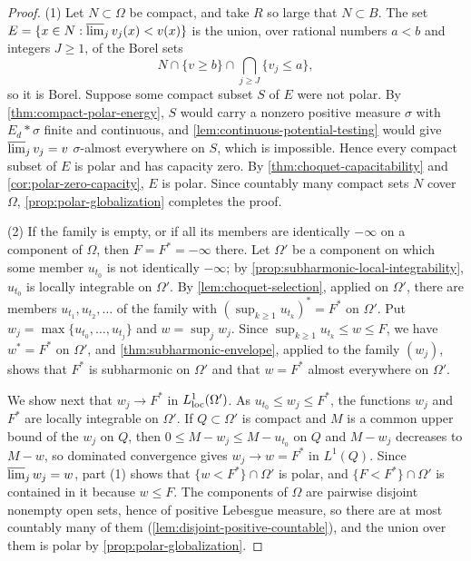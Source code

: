 \begin{proof}
(1) Let $N\subset\Omega$ be compact, and take $R$ so large that $N\subset B$. The set $E=\{x\in N:\varlimsup_jv_j(x)<v(x)\}$ is the union, over rational numbers $a<b$ and integers $J\geq1$, of the Borel sets
\[
 N\cap\{v\geq b\}\cap\bigcap_{j\geq J}\{v_j\leq a\},
\]
so it is Borel. Suppose some compact subset $S$ of $E$ were not polar. By \cref{thm:compact-polar-energy}, $S$ would carry a nonzero positive measure $\sigma$ with $E_d*\sigma$ finite and continuous, and \cref{lem:continuous-potential-testing} would give $\varlimsup_jv_j=v$ $\sigma$-almost everywhere on $S$, which is impossible. Hence every compact subset of $E$ is polar and has capacity zero. By \cref{thm:choquet-capacitability} and \cref{cor:polar-zero-capacity}, $E$ is polar. Since countably many compact sets $N$ cover $\Omega$, \cref{prop:polar-globalization} completes the proof.

(2) If the family is empty, or if all its members are identically $-\infty$ on a component of $\Omega$, then $F=F^*=-\infty$ there. Let $\Omega'$ be a component on which some member $u_{t_0}$ is not identically $-\infty$; by \cref{prop:subharmonic-local-integrability}, $u_{t_0}$ is locally integrable on $\Omega'$. By \cref{lem:choquet-selection}, applied on $\Omega'$, there are members $u_{t_1},u_{t_2},\ldots$ of the family with $(\sup_{k\geq1}u_{t_k})^*=F^*$ on $\Omega'$. Put $w_j=\max\{u_{t_0},\ldots,u_{t_j}\}$ and $w=\sup_jw_j$. Since $\sup_{k\geq1}u_{t_k}\leq w\leq F$, we have $w^*=F^*$ on $\Omega'$, and \cref{thm:subharmonic-envelope}, applied to the family $(w_j)$, shows that $F^*$ is subharmonic on $\Omega'$ and that $w=F^*$ almost everywhere on $\Omega'$.

We show next that $w_j\to F^*$ in $L^1_{\mathrm{loc}}(\Omega')$. As $u_{t_0}\leq w_j\leq F^*$, the functions $w_j$ and $F^*$ are locally integrable on $\Omega'$. If $Q\subset\Omega'$ is compact and $M$ is a common upper bound of the $w_j$ on $Q$, then $0\leq M-w_j\leq M-u_{t_0}$ on $Q$ and $M-w_j$ decreases to $M-w$, so dominated convergence gives $w_j\to w=F^*$ in $L^1(Q)$. Since $\varlimsup_jw_j=w$, part (1) shows that $\{w<F^*\}\cap\Omega'$ is polar, and $\{F<F^*\}\cap\Omega'$ is contained in it because $w\leq F$. The components of $\Omega$ are pairwise disjoint nonempty open sets, hence of positive Lebesgue measure, so there are at most countably many of them (\cref{lem:disjoint-positive-countable}), and the union over them is polar by \cref{prop:polar-globalization}.
\end{proof}

